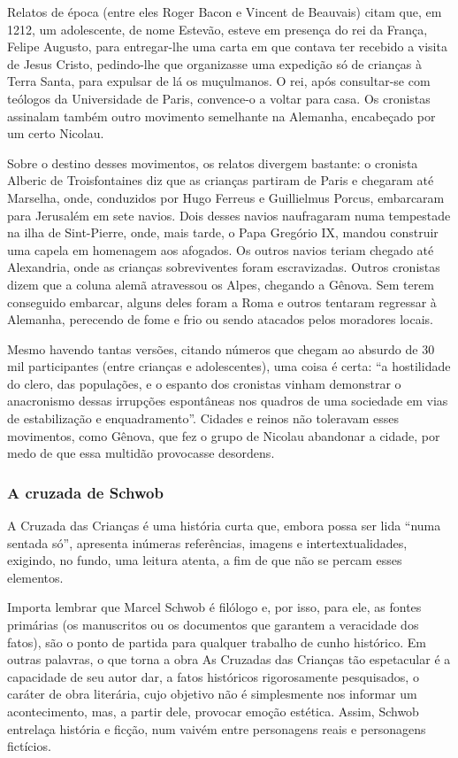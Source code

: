 \documentclass[12pt]{extarticle}
\begin{document}
Relatos de época (entre eles Roger Bacon e Vincent de Beauvais) citam
que, em 1212, um adolescente, de nome Estevão, esteve em presença do rei
da França, Felipe Augusto, para entregar-lhe uma carta em que contava
ter recebido a visita de Jesus Cristo, pedindo-lhe que organizasse uma
expedição só de crianças à Terra Santa, para expulsar de lá os
muçulmanos. O rei, após consultar-se com teólogos da Universidade de
Paris, convence-o a voltar para casa. Os cronistas assinalam também
outro movimento semelhante na Alemanha, encabeçado por um certo
Nicolau.

Sobre o destino desses movimentos, os relatos divergem bastante: o
cronista Alberic de Troisfontaines diz que as crianças partiram de Paris
e chegaram até Marselha, onde, conduzidos por Hugo Ferreus e Guillielmus
Porcus, embarcaram para Jerusalém em sete navios. Dois desses navios
naufragaram numa tempestade na ilha de Sint-Pierre, onde, mais tarde, o
Papa Gregório IX, mandou construir uma capela em homenagem aos afogados.
Os outros navios teriam chegado até Alexandria, onde as crianças
sobreviventes foram escravizadas. Outros cronistas dizem que a coluna
alemã atravessou os Alpes, chegando a Gênova. Sem terem conseguido
embarcar, alguns deles foram a Roma e outros tentaram regressar à
Alemanha, perecendo de fome e frio ou sendo atacados pelos moradores
locais.

Mesmo havendo tantas versões, citando números que chegam ao absurdo de
30 mil participantes (entre crianças e adolescentes), uma coisa é certa:
``a hostilidade do clero, das populações, e o espanto dos cronistas
vinham demonstrar o anacronismo dessas irrupções espontâneas nos quadros
de uma sociedade em vias de estabilização e enquadramento''. Cidades e
reinos não toleravam esses movimentos, como Gênova, que fez o grupo de
Nicolau abandonar a cidade, por medo de que essa multidão provocasse
desordens.

\subsubsection{A cruzada de Schwob}

A Cruzada das Crianças é uma história curta que, embora possa ser lida
``numa sentada só'', apresenta inúmeras referências, imagens e
intertextualidades, exigindo, no fundo, uma leitura atenta, a fim de que
não se percam esses elementos.

Importa lembrar que Marcel Schwob é filólogo e, por isso, para ele, as
fontes primárias (os manuscritos ou os documentos que garantem a
veracidade dos fatos), são o ponto de partida para qualquer trabalho de
cunho histórico. Em outras palavras, o que torna a obra As Cruzadas das
Crianças tão espetacular é a capacidade de seu autor dar, a fatos
históricos rigorosamente pesquisados, o caráter de obra literária, cujo
objetivo não é simplesmente nos informar um acontecimento, mas, a partir
dele, provocar emoção estética. Assim, Schwob entrelaça história e
ficção, num vaivém entre personagens reais e personagens fictícios.
\end{document}

